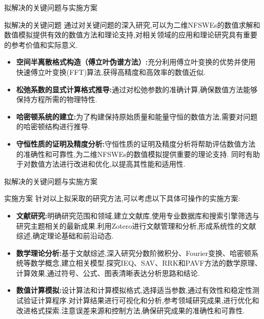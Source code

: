 \documentclass[aspectratio=169]{beamer}
\begin{document}
\begin{frame}{拟解决的关键问题与实施方案}
	\begin{block}{拟解决的关键问题}
		{\footnotesize 通过对关键问题的深入研究,可以为二维NFSWEs的数值求解和数值模拟提供有效的数值方法和理论支持,对相关领域的应用和理论研究具有重要的参考价值和实际意义.}
		\begin{itemize}
		\item {\footnotesize \textbf{\textcolor[rgb]{0.227,0.373,0.306}{空间半离散格式构造（傅立叶伪谱方法）:}}充分利用傅立叶变换的优势并使用快速傅立叶变换(FFT)算法,获得高精度和高效率的数值近似.}
		\item {\footnotesize \textbf{\textcolor[rgb]{0.227,0.373,0.306}{松弛系数的显式计算格式推导:}}通过对松弛参数的准确计算,确保数值方法能够保持方程所需的物理特性.}
		\item {\footnotesize \textbf{\textcolor[rgb]{0.227,0.373,0.306}{哈密顿系统的建立:}}为了构建保持原始质量和能量守恒的数值方法,需要对问题的哈密顿结构进行推导.}
		\item {\footnotesize \textbf{\textcolor[rgb]{0.227,0.373,0.306}{守恒性质的证明及精度分析:}}守恒性质的证明及精度分析将帮助评估数值方法的准确性和可靠性,为二维NFSWEs的数值模拟提供重要的理论支持. 同时有助于对数值方法进行改进和优化,以提高其性能和适用性.}
		\end{itemize}
	\end{block}
	\end{frame}

\begin{frame}{拟解决的关键问题与实施方案}
	\begin{block}{实施方案}
		{\footnotesize 针对以上拟采取的研究方法,可以考虑以下具体可操作的实施方案:}
		\begin{itemize}
		\item {\footnotesize \textbf{\textcolor[rgb]{0.227,0.373,0.306}{文献研究:}}明确研究范围和领域,建立文献库,使用专业数据库和搜索引擎筛选与研究主题相关的最新成果.利用Zotero进行文献管理和分析,形成系统性的文献综述,确定理论基础和前沿动态.}
		\item {\footnotesize \textbf{\textcolor[rgb]{0.227,0.373,0.306}{数学理论分析:}}基于文献综述,深入研究分数阶微积分、Fourier变换、哈密顿系统等数学概念,建立相关模型.探究IEQ、SAV、RRK和PAVF方法的数学原理、计算效果,通过符号、公式、图表清晰表达分析思路和结论.}
		\item {\footnotesize \textbf{\textcolor[rgb]{0.227,0.373,0.306}{数值计算模拟:}}设计算法和计算模拟格式,选择适当参数,通过有效性和稳定性测试验证计算程序.对计算结果进行可视化和分析,参考领域研究成果,进行优化和改进格式探索.注意误差来源和控制方法,确保研究成果的准确性和可靠性.}
		\end{itemize}
	\end{block}
	\end{frame}
\end{document}
